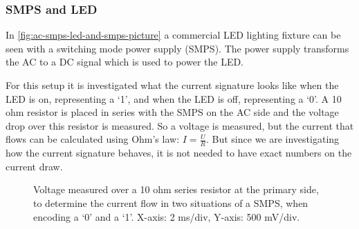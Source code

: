 

\subsubsection{SMPS and LED}

In \autoref{fig:ac-smps-led-and-smps-picture} a commercial LED lighting fixture can be seen with a switching mode power supply (SMPS).
The power supply transforms the AC to a DC signal which is used to power the LED.




For this setup it is investigated what the current signature looks like when the LED is on, representing a `1', and when the LED is off,  representing a `0'.
A 10 ohm resistor is placed in series with the SMPS on the AC side and the voltage drop over this resistor is measured.
So a voltage is measured, but the current that flows can be calculated using Ohm's law: $I = \frac{U}{R}$.
But since we are investigating how the current signature behaves, it is not needed to have exact numbers on the current draw.








\begin{figure}[h]
	\centering     %

	\caption{Voltage measured over a 10 ohm series resistor at the primary side, to determine the current flow in two situations of a SMPS, when encoding a `0' and a `1'. X-axis: 2 ms/div, Y-axis: 500 mV/div.}
\end{figure}






